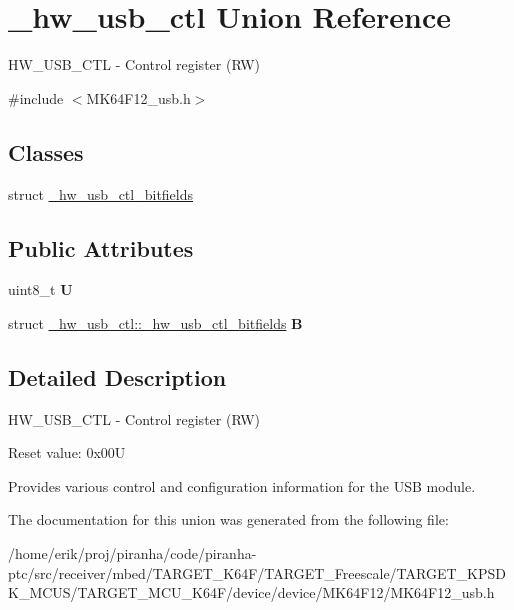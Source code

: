 \hypertarget{union__hw__usb__ctl}{}\section{\+\_\+hw\+\_\+usb\+\_\+ctl Union Reference}
\label{union__hw__usb__ctl}


H\+W\+\_\+\+U\+S\+B\+\_\+\+C\+TL -\/ Control register (RW)  




{\ttfamily \#include $<$M\+K64\+F12\+\_\+usb.\+h$>$}

\subsection*{Classes}
\begin{DoxyCompactItemize}
\item 
struct \hyperlink{struct__hw__usb__ctl_1_1__hw__usb__ctl__bitfields}{\+\_\+hw\+\_\+usb\+\_\+ctl\+\_\+bitfields}
\end{DoxyCompactItemize}
\subsection*{Public Attributes}
\begin{DoxyCompactItemize}
\item 
uint8\+\_\+t {\bfseries U}\hypertarget{union__hw__usb__ctl_ab9d8b3924a9c3c24e2cde73b66ad41f5}{}\label{union__hw__usb__ctl_ab9d8b3924a9c3c24e2cde73b66ad41f5}

\item 
struct \hyperlink{struct__hw__usb__ctl_1_1__hw__usb__ctl__bitfields}{\+\_\+hw\+\_\+usb\+\_\+ctl\+::\+\_\+hw\+\_\+usb\+\_\+ctl\+\_\+bitfields} {\bfseries B}\hypertarget{union__hw__usb__ctl_ab849dc47c049256c9575bf0b1573c3bf}{}\label{union__hw__usb__ctl_ab849dc47c049256c9575bf0b1573c3bf}

\end{DoxyCompactItemize}


\subsection{Detailed Description}
H\+W\+\_\+\+U\+S\+B\+\_\+\+C\+TL -\/ Control register (RW) 

Reset value\+: 0x00U

Provides various control and configuration information for the U\+SB module. 

The documentation for this union was generated from the following file\+:\begin{DoxyCompactItemize}
\item 
/home/erik/proj/piranha/code/piranha-\/ptc/src/receiver/mbed/\+T\+A\+R\+G\+E\+T\+\_\+\+K64\+F/\+T\+A\+R\+G\+E\+T\+\_\+\+Freescale/\+T\+A\+R\+G\+E\+T\+\_\+\+K\+P\+S\+D\+K\+\_\+\+M\+C\+U\+S/\+T\+A\+R\+G\+E\+T\+\_\+\+M\+C\+U\+\_\+\+K64\+F/device/device/\+M\+K64\+F12/M\+K64\+F12\+\_\+usb.\+h\end{DoxyCompactItemize}

